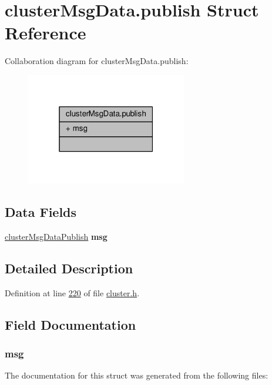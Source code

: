 \hypertarget{structclusterMsgData_8publish}{}\section{cluster\+Msg\+Data.\+publish Struct Reference}
\label{structclusterMsgData_8publish}


Collaboration diagram for cluster\+Msg\+Data.\+publish\+:\nopagebreak
\begin{figure}[H]
\begin{center}
\leavevmode
\includegraphics[width=199pt]{structclusterMsgData_8publish__coll__graph}
\end{center}
\end{figure}
\subsection*{Data Fields}
\begin{DoxyCompactItemize}
\item 
\mbox{\label{structclusterMsgData_8publish_a6e2baaf3b97dbeef01c0043275f9a0e7}} 
\hyperlink{structclusterMsgDataPublish}{cluster\+Msg\+Data\+Publish} {\bfseries msg}
\end{DoxyCompactItemize}


\subsection{Detailed Description}


Definition at line \hyperlink{cluster_8h_source_l00220}{220} of file \hyperlink{cluster_8h_source}{cluster.\+h}.



\subsection{Field Documentation}
\mbox{\label{structclusterMsgData_8publish_a6e2baaf3b97dbeef01c0043275f9a0e7}} 
\subsubsection{\texorpdfstring{msg}{msg}}
{\footnotesize\ttfamily }



The documentation for this struct was generated from the following files\+:
